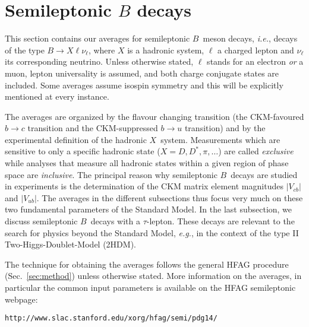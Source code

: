 

\section{Semileptonic $B$ decays}
\label{sec:slbdecays}

This section contains our averages for semileptonic $B$~meson decays,
{\it i.e.}, decays of the type $B\to X\ell\nu_\ell$, where $X$ is a
hadronic system, $\ell$ a charged lepton and $\nu_\ell$ its corresponding
neutrino. Unless otherwise stated, $\ell$ stands for an electron
\emph{or} a muon, lepton universality is assumed, and both charge
conjugate states are included. Some averages assume isospin symmetry
and this will be explicitly mentioned at every instance.

The averages are organized by the flavour changing transition
(the CKM-favoured $b\to c$ transition and the CKM-suppressed $b\to u$
transition) and by the experimental definition of the hadronic
$X$~system. Measurements which are sensitive to only a specific
hadronic state ($X=D,D^*,\pi,\dots$) are called \emph{exclusive} while
analyses that measure all hadronic states within a given region of
phase space are \emph{inclusive}. The principal reason why semileptonic
$B$~decays are studied in experiments is the determination of the CKM
matrix element magnitudes $|V_{cb}|$ and $|V_{ub}|$. The averages in
the different subsections thus focus very much on these two
fundamental parameters of the Standard Model. In the last subsection,
we discuss semileptonic $B$~decays with a $\tau$-lepton. These
decays are relevant to the search for physics beyond the Standard
Model, {\it e.g.}, in the context of the type II
Two-Higgs-Doublet-Model (2HDM).

The technique for obtaining the averages follows the general HFAG
procedure (Sec.~\ref{sec:method}) unless otherwise stated. More
information on the averages, in particular the common input parameters
is available on the HFAG semileptonic webpage:

\centerline{\tt http://www.slac.stanford.edu/xorg/hfag/semi/pdg14/}




